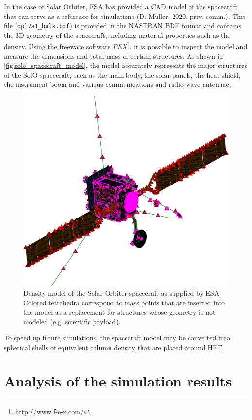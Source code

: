 In the case of Solar Orbiter, ESA has provided a CAD model of the spacecraft that can serve as a reference for simulations (D. Müller, 2020, priv. comm.). This file (\texttt{dpl7a1\_bulk.bdf}) is provided in the NASTRAN BDF format
and contains the 3D geometry of the spacecraft, including material properties such as the density. Using the freeware software \textit{FEX}\footnote{\url{http://www.f-e-x.com/}}, it is possible to inspect the model and measure the dimensions and total mass of certain structures. As shown in \autoref{fig:solo_spacecraft_model}, the model accurately represents the major structures of the SolO spacecraft, such as the main body, the solar panels, the heat shield, the instrument boom and various communications and radio wave antennae.

\begin{figure}
	\centering
	\includegraphics[width=0.7\linewidth]{images/solo_spacecraft_model}
	\caption[Density model of the Solar Orbiter spacecraft]{Density model of the Solar Orbiter spacecraft as supplied by ESA. Colored tetrahedra correspond to mass points that are inserted into the model as a replacement for structures whose geometry is not modeled (e.g. scientific payload).}
	\label{fig:solo_spacecraft_model}
\end{figure}

To speed up future simulations, the spacecraft model may be converted into spherical shells of equivalent column density that are placed around HET.

\section{Analysis of the simulation results}
